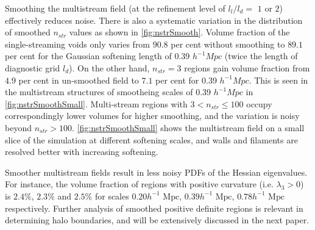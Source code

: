 \documentclass[fleqn,usenatbib,useAMS]{mnras}
\newcommand\hl{\bgroup\markoverwith
  {\textcolor{yellow}{\rule[-.5ex]{2pt}{2.5ex}}}\ULon}
\begin{document}
Smoothing the multistream field (at the refinement level of $l_l/l_d=$ $1$ or $2$) effectively reduces noise. There is also a systematic variation in the distribution of smoothed $n_{str}$ values as shown in \autoref{fig:nstrSmooth}. Volume fraction of the single-streaming voids only varies from $90.8$ per cent without smoothing to $89.1$ per cent for the Gaussian softening length of 0.39 $h^{-1} Mpc$ (twice the length of diagnostic grid $l_d$). On the other hand, $n_{str} = 3$ regions gain volume fraction from $4.9$ per cent in un-smoothed field to $7.1$ per cent for 0.39 $h^{-1} Mpc$. This is seen in the multistream structures of smootheing scales of 0.39 $h^{-1} Mpc$ in \autoref{fig:nstrSmoothSmall}. Multi-stream regions with $ 3 < n_{str} \leq 100 $ occupy correspondingly lower volumes for higher smoothing, and the variation is noisy beyond $n_{str} > 100$. \autoref{fig:nstrSmoothSmall} shows the multistream field on a small slice of the simulation at different softening scales, and walls and filaments are resolved better with increasing softening.                                                                

Smoother multistream fields result in less noisy PDFs of the Hessian eigenvalues. For instance, the volume fraction of regions with positive curvature (i.e. $\lambda_3 > 0$) is $2.4\%$, $2.3\%$ and $2.5\%$ for scales $0.20 h^{-1} \text{ Mpc}$, $0.39 h^{-1} \text{ Mpc}$, $0.78 h^{-1} \text{ Mpc}$ respectively. Further analysis of smoothed positive definite regions is relevant in determining halo boundaries, and will be extensively discussed in the next paper. 
\end{document}

